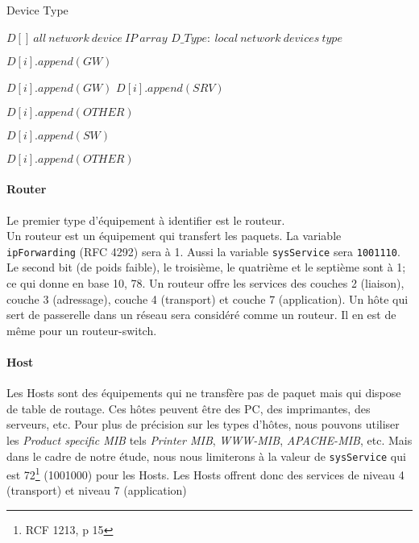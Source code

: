 \begin{center}
\begin{algorithm}
\caption{Device Type}
\label{device_type}
\begin{algorithmic}[1]
\Require $D[] ~ all~ network~ device~ IP~array$
\Ensure $D\_Type:~ local~ network~ devices~ type$

  
   	 \State $D[i].append(GW)$
   	 
   	
   	 \State $D[i].append(GW)$
   	 \Else
   	  \State $D[i].append(SRV)$
   	 \EndIf
 
   	\Else
   	 \State $D[i].append(OTHER)$
   	\EndIf
     	 
   	 \State $D[i].append(SW)$
   	 
   \Else
    \State $D[i].append(OTHER)$  
   \EndIf
 \EndFor
   
    
\EndFunction

\end{algorithmic}
\end{algorithm}
\end{center}

\paragraph{Router\\}
Le premier type d'équipement à identifier est le routeur.\\
Un routeur est un équipement qui transfert les paquets. La variable \texttt{ipForwarding} (RFC 4292) sera à 1. Aussi la variable \texttt{sysService} sera \texttt{1001110}. Le second bit (de poids faible), le troisième, le quatrième et le septième sont à 1; ce qui donne en base 10, 78. Un routeur offre les services des couches 2 (liaison), couche 3 (adressage), couche 4 (transport) et couche 7 (application). Un hôte qui sert de passerelle dans un réseau sera considéré comme un routeur. Il en est de même pour un routeur-switch.

\paragraph{Host\\}
Les Hosts sont des équipements qui ne transfère pas de paquet mais qui dispose de table de routage. Ces hôtes peuvent être des PC, des imprimantes, des serveurs, etc. Pour plus de précision sur les types d'hôtes, nous pouvons utiliser les \emph{Product specific MIB} tels \emph{Printer MIB}, \emph{WWW-MIB}, \emph{APACHE-MIB}, etc. Mais dans le cadre de notre étude, nous nous limiterons à la valeur de \texttt{sysService} qui est 72\footnote{RCF 1213, p 15} (1001000) pour les Hosts. Les Hosts offrent donc des services de niveau 4 (transport) et niveau 7 (application)

